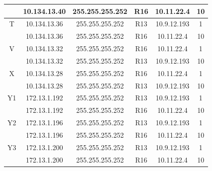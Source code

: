 \documentclass[12pt, a4paper, spanish]{article}
\begin{document}
\begin{center}
\begin{tabular}{|c|c|c|c|c|c|}
	 & 10.134.13.40 & 255.255.255.252 & R16 & 10.11.22.4 & 10\\
	\hline
	T & 10.134.13.36 & 255.255.255.252 & R13 & 10.9.12.193 & 1\\
	 & 10.134.13.36 & 255.255.255.252 & R16 & 10.11.22.4 & 10\\
	\hline
	V & 10.134.13.32 & 255.255.255.252 & R16 & 10.11.22.4 & 1\\
	 & 10.134.13.32 & 255.255.255.252 & R13 & 10.9.12.193 & 10\\
	\hline
	X & 10.134.13.28 & 255.255.255.252 & R16 & 10.11.22.4 & 1\\
	 & 10.134.13.28 & 255.255.255.252 & R13 & 10.9.12.193 & 10\\
	\hline
	Y1 & 172.13.1.192 & 255.255.255.252 & R13 & 10.9.12.193 & 1\\
	 & 172.13.1.192 & 255.255.255.252 & R16 & 10.11.22.4 & 10\\
	\hline
	Y2 & 172.13.1.196 & 255.255.255.252 & R13 & 10.9.12.193 & 1\\
	 & 172.13.1.196 & 255.255.255.252 & R16 & 10.11.22.4 & 10\\
	\hline
	Y3 & 172.13.1.200 & 255.255.255.252 & R13 & 10.9.12.193 & 1\\
	 & 172.13.1.200 & 255.255.255.252 & R16 & 10.11.22.4 & 10\\
	\hline
\end{tabular}
\end{center}
\end{document}
